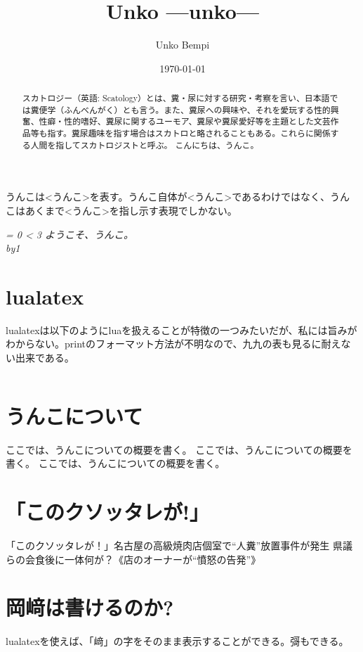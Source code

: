 \documentclass{ltjsarticle}
\author{Unko Bempi}
\date{\和暦\today}
\title{Unko ---unko---}
\def\myfor#1{
    \it = 0 \loop\ifnum\it < #1
    ようこそ、うんこ。\\
    \advance\it by1\repeat
}
\begin{document}
\maketitle
\tableofcontents
%
\begin{abstract}
    スカトロジー（英語: Scatology）とは、糞・尿に対する研究・考察を言い、日本語では糞便学（ふんべんがく）とも言う。また、糞尿への興味や、それを愛玩する性的興奮、性癖・性的嗜好、糞尿に関するユーモア、糞尿や糞尿愛好等を主題とした文芸作品等も指す。糞尿趣味を指す場合はスカトロと略されることもある。これらに関係する人間を指してスカトロジストと呼ぶ\cite{wiki}。
    こんにちは、うんこ。
\end{abstract}
%
うんこは<うんこ>を表す。うんこ自体が<うんこ>であるわけではなく、うんこはあくまで<うんこ>を指し示す表現でしかない。
    \myfor{3}
%
\section{lualatex}
\newcommand{\texcmd}{some txtxtxtxtxtxt}
%
lualatexは以下のようにluaを扱えることが特徴の一つみたいだが、私には旨みがわからない。printのフォーマット方法が不明なので、九九の表も見るに耐えない出来である。
%
\begin{center}
    $ $
\end{center}
%
%
\section{うんこについて}
ここでは、うんこについての概要を書く。
ここでは、うんこについての概要を書く。
ここでは、うんこについての概要を書く。

\section{「このクソッタレが!」}
「このクソッタレが！」名古屋の高級焼肉店個室で“人糞”放置事件が発生 県議らの会食後に一体何が？《店のオーナーが“憤怒の告発”》


\section{岡﨑は書けるのか?}
lualatexを使えば、「﨑」の字をそのまま表示することができる。彁\cite{yurei}もできる。
\end{document}
